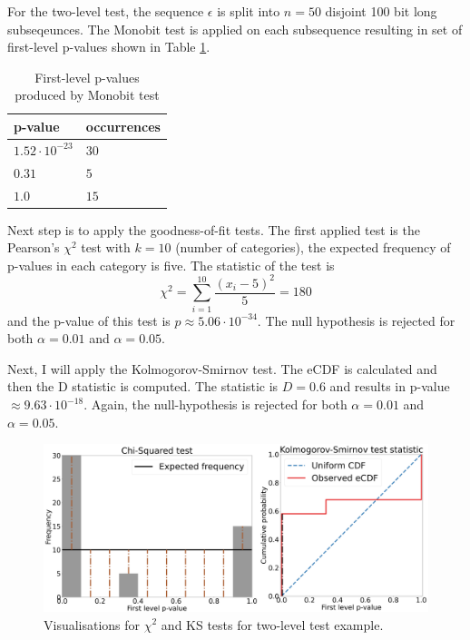 \documentclass[
  digital,     %
  oneside,     %
  nosansbold,  %
  nocolorbold, %
  nolof,         %
  nolot,         %
]{fithesis4}
\begin{document}
For the two-level test, the sequence $\epsilon$ is split into $n=50$  disjoint 100 bit long subseqeunces. The Monobit test is applied on each subsequence resulting in set of first-level p-values shown in Table \ref{tab:first_pvalues}.


\begin{table}
  \begin{tabularx}{0.4\textwidth}{ll}
    \toprule
    p-value & occurrences  \\
    \midrule
    $1.52 \cdot 10^{-23}$ & $30$\\
    $0.31$ & $5$\\
    $1.0$ & $15$\\
    \bottomrule
  \end{tabularx}
  \caption{First-level p-values produced by Monobit test}
  \label{tab:first_pvalues}
\end{table}

Next step is to apply the goodness-of-fit tests. The first applied test is the Pearson's $\chi^2$ test with $k=10$ (number of categories), the expected frequency of p-values in each category is five. The statistic of the test is
\[\chi^2 = \sum_{i=1}^{10} \dfrac{(x_i - 5)^2}{5} = 180 \]
and the p-value of this test is $p\approx5.06\cdot10^{-34}$. The null hypothesis is rejected for both $\alpha = 0.01$ and $\alpha = 0.05$. 

Next, I will apply the Kolmogorov-Smirnov test. The eCDF is calculated and then the D statistic is computed. The statistic is $D = 0.6$ and results in p-value $\approx 9.63\cdot10^{-18}$. Again, the null-hypothesis is rejected for both $\alpha = 0.01$ and $\alpha = 0.05$. 

\begin{figure}
  \begin{center}
    \includegraphics[width=12.5cm]{figures/two_example.png}
  \end{center}
  \caption{Visualisations for $\chi^2$ and KS tests for two-level test example.}
  \label{fig:two_example}
\end{figure}
\end{document}
